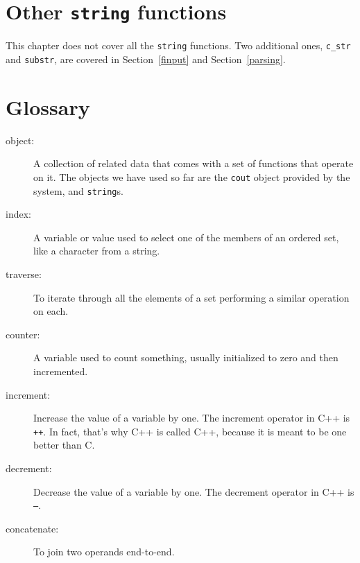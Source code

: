\section{Other {\tt string} functions}

This chapter does not cover all the {\tt string} functions.
Two additional ones, {\tt c\_str} and {\tt substr}, are covered
in Section~\ref{finput} and Section~\ref{parsing}.

\section{Glossary}

\begin{description}

\item[object:] A collection of related data that comes with a set of
functions that operate on it.  The objects we have used so far are the
{\tt cout} object provided by the system, and {\tt string}s.

\item[index:]  A variable or value used to select one of the
members of an ordered set, like a character from a string.

\item[traverse:]  To iterate through all the elements of a set
performing a similar operation on each.

\item[counter:]  A variable used to count something, usually
initialized to zero and then incremented.

\item[increment:]  Increase the value of a variable by one.
The increment operator in C++ is {\tt ++}.  In fact, that's
why C++ is called C++, because it is meant to be one better
than C.

\item[decrement:]  Decrease the value of a variable by one.
The decrement operator in C++ is {\tt --}.

\item[concatenate:] To join two operands end-to-end.


\end{description}

